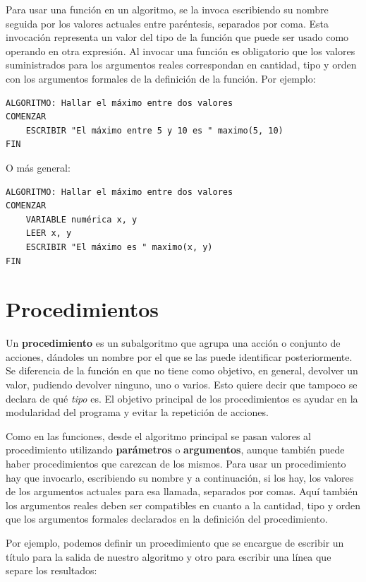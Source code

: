 \documentclass[]{book}
\begin{document}
Para usar una función en un algoritmo, se la invoca escribiendo su
nombre seguida por los valores actuales entre paréntesis, separados por
coma. Esta invocación representa un valor del tipo de la función que
puede ser usado como operando en otra expresión. Al invocar una función
es obligatorio que los valores suministrados para los argumentos reales
correspondan en cantidad, tipo y orden con los argumentos formales de la
definición de la función. Por ejemplo:

\begin{verbatim}
ALGORITMO: Hallar el máximo entre dos valores
COMENZAR
    ESCRIBIR "El máximo entre 5 y 10 es " maximo(5, 10)
FIN
\end{verbatim}

O más general:

\begin{verbatim}
ALGORITMO: Hallar el máximo entre dos valores
COMENZAR
    VARIABLE numérica x, y
    LEER x, y
    ESCRIBIR "El máximo es " maximo(x, y)
FIN
\end{verbatim}

\section{Procedimientos}\label{procedimientos}

Un \textbf{procedimiento} es un subalgoritmo que agrupa una acción o
conjunto de acciones, dándoles un nombre por el que se las puede
identificar posteriormente. Se diferencia de la función en que no tiene
como objetivo, en general, devolver un valor, pudiendo devolver ninguno,
uno o varios. Esto quiere decir que tampoco se declara de qué
\emph{tipo} es. El objetivo principal de los procedimientos es ayudar en
la modularidad del programa y evitar la repetición de acciones.

Como en las funciones, desde el algoritmo principal se pasan valores al
procedimiento utilizando \textbf{parámetros} o \textbf{argumentos},
aunque también puede haber procedimientos que carezcan de los mismos.
Para usar un procedimiento hay que invocarlo, escribiendo su nombre y a
continuación, si los hay, los valores de los argumentos actuales para
esa llamada, separados por comas. Aquí también los argumentos reales
deben ser compatibles en cuanto a la cantidad, tipo y orden que los
argumentos formales declarados en la definición del procedimiento.

Por ejemplo, podemos definir un procedimiento que se encargue de
escribir un título para la salida de nuestro algoritmo y otro para
escribir una línea que separe los resultados:
\end{document}
